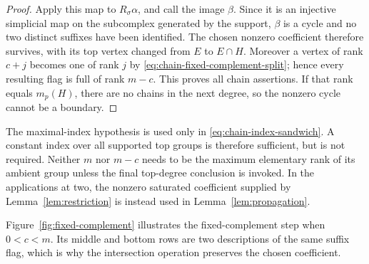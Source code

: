 \begin{proof}
Apply this map to $R_\sigma\alpha$, and call the image
$\beta$. Since it is an injective simplicial map on the
subcomplex generated by the support, $\beta$ is a cycle and
no two distinct suffixes have been identified. The chosen
nonzero coefficient therefore survives, with its top vertex
changed from $E$ to $E\cap H$. Moreover a vertex of rank
$c+j$ becomes one of rank $j$ by
\eqref{eq:chain-fixed-complement-split}; hence every resulting
flag is full of rank $m-c$. This proves all chain assertions.
If that rank equals $m_p(H)$, there are no chains in the
next degree, so the nonzero cycle cannot be a boundary.
\end{proof}

The maximal-index hypothesis is used only in
\eqref{eq:chain-index-sandwich}. A constant index over all
supported top groups is therefore sufficient, but is not
required. Neither $m$ nor $m-c$ needs to be the maximum
elementary rank of its ambient group unless the final
top-degree conclusion is invoked. In the applications at
two, the nonzero saturated coefficient supplied by
Lemma~\ref{lem:restriction} is instead used in
Lemma~\ref{lem:propagation}.

Figure~\ref{fig:fixed-complement} illustrates the fixed-complement step
when $0<c<m$. Its middle and bottom rows are two descriptions of the
same suffix flag, which is why the intersection operation preserves
the chosen coefficient.

